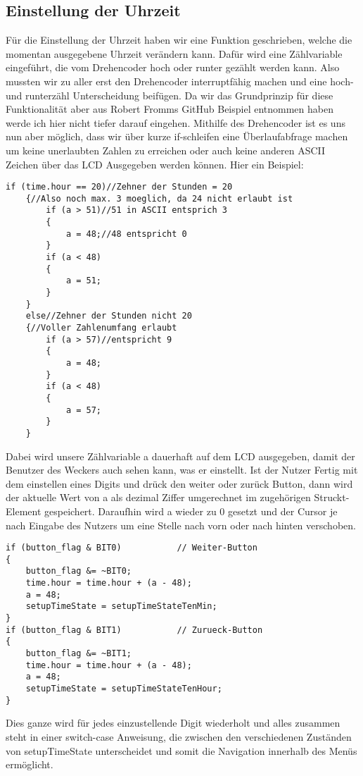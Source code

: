 \documentclass[openright,twoside,11pt,a4paper]{scrartcl}
\begin{document}
\begin{flushleft}
		 \subsection{Einstellung der Uhrzeit}
	 	Für die Einstellung der Uhrzeit haben wir eine Funktion geschrieben, welche die momentan ausgegebene Uhrzeit verändern kann. Dafür wird eine Zählvariable eingeführt, die vom Drehencoder hoch oder runter gezählt werden kann. Also mussten wir zu aller erst den Drehencoder interruptfähig machen und eine hoch- und runterzähl Unterscheidung beifügen. Da wir das Grundprinzip für diese Funktionalität aber aus Robert Fromms GitHub Beispiel entnommen haben werde ich hier nicht tiefer darauf eingehen. Mithilfe des Drehencoder ist es uns nun aber möglich, dass wir über kurze if-schleifen eine Überlaufabfrage machen um keine unerlaubten Zahlen zu erreichen oder auch keine anderen ASCII Zeichen über das LCD Ausgegeben werden können. Hier ein Beispiel:
	 	\begin{lstlisting}
if (time.hour == 20)//Zehner der Stunden = 20
	{//Also noch max. 3 moeglich, da 24 nicht erlaubt ist
		if (a > 51)//51 in ASCII entsprich 3
		{
			a = 48;//48 entspricht 0
		}
		if (a < 48)
		{
			a = 51;
		}
	}
	else//Zehner der Stunden nicht 20
	{//Voller Zahlenumfang erlaubt
		if (a > 57)//entspricht 9
		{
			a = 48;
		}
		if (a < 48)
		{
			a = 57;
		}
	}
	 	\end{lstlisting}
	 	Dabei wird unsere Zählvariable a dauerhaft auf dem LCD ausgegeben, damit der Benutzer des Weckers auch sehen kann, was er einstellt. Ist der Nutzer Fertig mit dem einstellen eines Digits und drück den weiter oder zurück Button, dann wird der aktuelle Wert von a als dezimal Ziffer umgerechnet im zugehörigen Struckt-Element gespeichert. Daraufhin wird a wieder zu 0 gesetzt und der Cursor je nach Eingabe des Nutzers um eine Stelle nach vorn oder nach hinten verschoben.
	 	\begin{lstlisting}
if (button_flag & BIT0)           // Weiter-Button
{
	button_flag &= ~BIT0;
	time.hour = time.hour + (a - 48);
	a = 48;
	setupTimeState = setupTimeStateTenMin;
}
if (button_flag & BIT1)           // Zurueck-Button
{
	button_flag &= ~BIT1;
	time.hour = time.hour + (a - 48);
	a = 48;
	setupTimeState = setupTimeStateTenHour;
}
	 	\end{lstlisting}
	 	Dies ganze wird für jedes einzustellende Digit wiederholt und alles zusammen steht in einer switch-case Anweisung, die zwischen den verschiedenen Zuständen von setupTimeState unterscheidet und somit die Navigation innerhalb des Menüs ermöglicht. \\

\end{flushleft}
\end{document}
